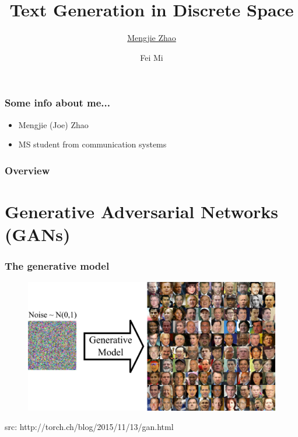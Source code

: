 \documentclass{beamer}
\title[Text Generation in Discrete Space]{Text Generation in Discrete Space} %
\author[M. Zhao et F. Mi]{\underline{Mengjie Zhao}  \and Fei Mi } %
\institute[] %
{
\footnotesize{Artificial Intelligence Laboratory (LIA)}
\date{\today}
\\\medskip
\medskip
\medskip
\medskip
\medskip
\medskip
\medskip
\vspace{-1cm}
\begin{figure}
\texttt{[image: imgs/epfl1.eps]}
\end{figure}
}
\begin{document}
\begin{frame}
\titlepage %
\end{frame}

\begin{frame}
\frametitle{Some info about me...} 
\begin{itemize} 
\item Mengjie (Joe) Zhao
\item MS student from communication systems
\end{itemize}
\end{frame}

\begin{frame}
\frametitle{Overview} %
\tableofcontents %
\end{frame}


\section{Generative Adversarial Networks (GANs)} %

\begin{frame}
\frametitle{The generative model}
\begin{figure}
\includegraphics[width=0.8\linewidth]{imgs/w1_g_model.png}
\end{figure}
\hspace{7cm}\tiny{src: http://torch.ch/blog/2015/11/13/gan.html}
\end{frame}
\end{document}

